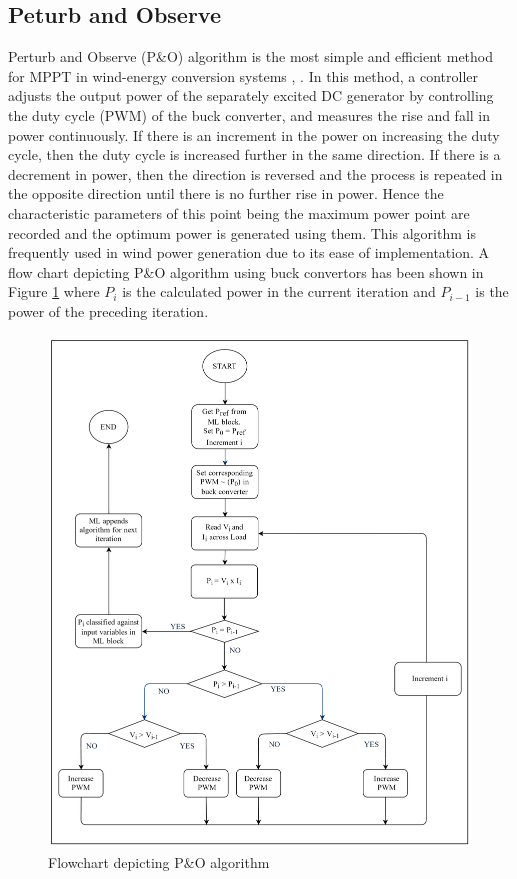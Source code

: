\subsection{Peturb and Observe}
Perturb and Observe (P\&O) algorithm is the most simple and efficient method for MPPT in wind-energy conversion systems \cite{RefJ13}, \cite{RefJ14}. In this method, a controller adjusts the output power of the separately excited DC generator by controlling the duty cycle (PWM) of the buck converter, and measures the rise and fall in power continuously. If there is an increment in the power on increasing the duty cycle, then the duty cycle is increased further in the same direction. If there is a decrement in power, then the direction is reversed and the process is repeated in the opposite direction until there is no further rise in power. Hence the characteristic parameters of this point being the maximum power point are recorded and the optimum power is generated using them. This algorithm is frequently used in wind power generation due to its ease of implementation. A flow chart depicting P\&O algorithm using buck convertors has been shown in Figure \ref{Figure:5} where $ P_i$ is the calculated power in the current iteration and $P_{i-1}$ is the power of the preceding iteration.
\begin{center}
\begin{figure}
\includegraphics[width=12cm,keepaspectratio]{5.png}
\caption{Flowchart depicting P\&O algorithm}
\label{Figure:5}    
\end{figure}
\end{center}

